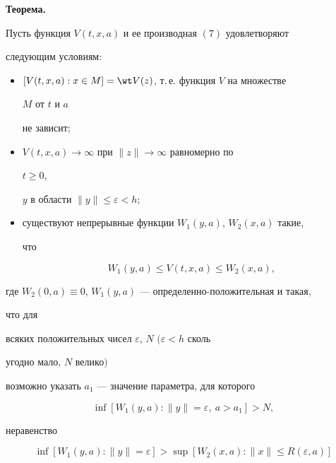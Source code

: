 {\bf Теорема.} {\it 


Пусть функция $V(t,x,a)$ и ее производная $(7)$ удовлетворяют  


следующим условиям$:$ 


\begin{itemize} 


\item[1)] $[V(t,x,a):x\in M]=\wt V(z)$, т.\,е. функция $V$ на множестве 


$M$ от $t$ и $a$ 


не зависит$;$ 


\item[2)] $V(t,x,a)\to\infty$ при $\|z\|\to\infty$ равномерно по 


$t\ge0$, 


$y$ в области $\|y\|\le\varepsilon<h;$ 


\item[3)] существуют непрерывные функции $W_1(y,a)$, $W_2(x,a)$ такие, 


что 


\begin{equation} 


W_1(y,a)\le V(t,x,a)\le W_2(x,a), 


\end{equation} 


\end{itemize} 


где $W_2(0,a)\equiv0$, $W_1(y,a)$ --- определенно-положительная и такая, 


что для  


всяких положительных чисел $\varepsilon$, $N$ $(\varepsilon<h$ сколь 


угодно мало, $N$ велико$)$  


возможно указать $a_1$ --- значение параметра, для которого 


\begin{equation} 


\inf[W_1(y,a):\|y\|=\varepsilon,\ a>a_1]>N, 


\end{equation} 


неравенство 


\begin{equation} 


\inf[W_1(y,a):\|y\|=\varepsilon]>\sup[W_2(x,a):\|x\|\le 


R(\varepsilon,a)] 


\end{equation} 


}
